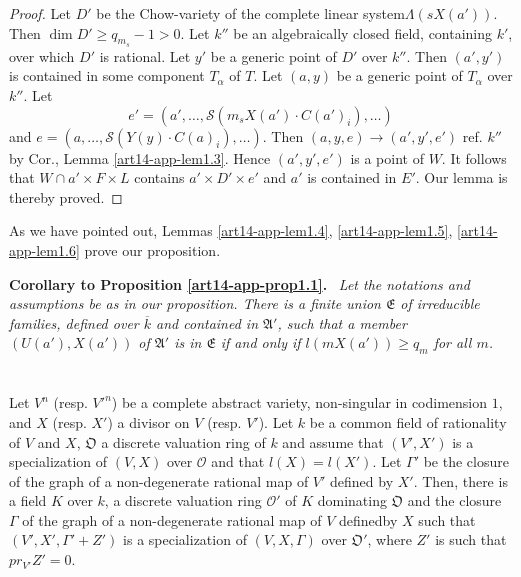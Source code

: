 \begin{proof}
Let $D'$ be the Chow-variety of the complete linear system\break $\Lambda(sX(a'))$. Then $\dim D'\geq q_{m_{s}}-1>0$. Let $k''$ be an algebraically closed field, containing $k'$, over which $D'$ is rational. Let $y'$ be a generic point of $D'$ over $k''$. Then $(a',y')$ is contained in some component $T_{\alpha}$ of $T$. Let $(a,y)$ be a generic point of $T_{\alpha}$ over $k''$. Let 
$$
e'=(a',\ldots,\mathscr{S}(m_{s}X(a')\cdot C(a')_{i}),\ldots)
$$ 
and $e=(a,\ldots,\mathscr{S}(Y(y)\cdot C(a)_{i}),\ldots )$. Then $(a,y,e)\to (a',y',e')$ ref. $k''$ by Cor., Lemma \ref{art14-app-lem1.3}. Hence $(a',y',e')$ is a point of $W$. It follows that $W\cap a'\times F\times L$ contains $a'\times D'\times e'$ and $a'$ is contained in $E'$. Our lemma is thereby proved.
\end{proof}

As we have pointed out, Lemmas \ref{art14-app-lem1.4}, \ref{art14-app-lem1.5}, \ref{art14-app-lem1.6} prove our proposition.

\medskip
\noindent
{\bf Corollary to Proposition \ref{art14-app-prop1.1}.}~ {\em Let the notations and assumptions be as in our proposition. There is a finite union $\mathfrak{E}$ of irreducible families, defined over $\overline{k}$ and contained in $\mathfrak{A}'$, such that a member $(U(a'),X(a'))$ of $\mathfrak{A}'$ is in $\mathfrak{E}$ if and only if $l(mX(a'))\geq q_{m}$ for all $m$.}

\section{}\label{art14-app-sec2}

\begin{subprop}\label{art14-app-prop2.1}
Let $V^{n}$ (resp. ${V'}^{n}$) be a complete abstract variety, non-singular in codimension $1$, and $X$ (resp. $X'$) a divisor on $V$ (resp. $V'$). Let $k$ be a common field of rationality of $V$ and $X$, $\mathfrak{O}$ a discrete valuation ring of $k$ and assume that $(V',X')$ is a specialization of $(V,X)$ over $\mathcal{O}$ and that $l(X)=l(X')$. Let $\Gamma'$ be the closure of the graph of a non-degenerate rational map of $V'$ defined by $X'$. Then, there is a field $K$ over $k$, a discrete valuation ring $\mathcal{O}'$ of $K$ dominating $\mathfrak{O}$ and the closure $\Gamma$ of the graph of a non-degenerate rational map of $V$ defined\pageoriginale by $X$ such that $(V',X',\Gamma'+Z')$ is a specialization of $(V,X,\Gamma)$ over $\mathfrak{O}'$, where $Z'$ is such that $pr_{V'}Z'=0$.
\end{subprop}

